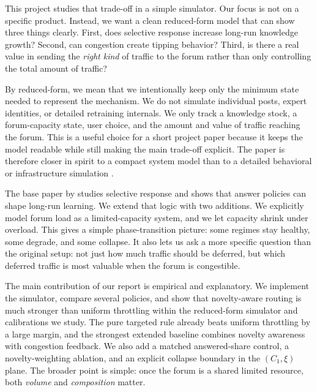 \documentclass{article}
\begin{document}
This project studies that trade-off in a simple simulator. Our focus is not on a specific product. Instead, we want a clean reduced-form model that can show three things clearly. First, does selective response increase long-run knowledge growth? Second, can congestion create tipping behavior? Third, is there a real value in sending the \emph{right kind} of traffic to the forum rather than only controlling the total amount of traffic?

By reduced-form, we mean that we intentionally keep only the minimum state needed to represent the mechanism. We do not simulate individual posts, expert identities, or detailed retraining internals. We only track a knowledge stock, a forum-capacity state, user choice, and the amount and value of traffic reaching the forum. This is a useful choice for a short project paper because it keeps the model readable while still making the main trade-off explicit. The paper is therefore closer in spirit to a compact system model than to a detailed behavioral or infrastructure simulation \citep{varian1992microeconomic,kleinrock1975queueing}.

The base paper by \citet{taitler2025selective} studies selective response and shows that answer policies can shape long-run learning. We extend that logic with two additions. We explicitly model forum load as a limited-capacity system, and we let capacity shrink under overload. This gives a simple phase-transition picture: some regimes stay healthy, some degrade, and some collapse. It also lets us ask a more specific question than the original setup: not just how much traffic should be deferred, but which deferred traffic is most valuable when the forum is congestible.

The main contribution of our report is empirical and explanatory. We implement the simulator, compare several policies, and show that novelty-aware routing is much stronger than uniform throttling within the reduced-form simulator and calibrations we study. The pure targeted rule already beats uniform throttling by a large margin, and the strongest extended baseline combines novelty awareness with congestion feedback. We also add a matched answered-share control, a novelty-weighting ablation, and an explicit collapse boundary in the $(C_1,\xi)$ plane. The broader point is simple: once the forum is a shared limited resource, both \emph{volume} and \emph{composition} matter.
\end{document}

